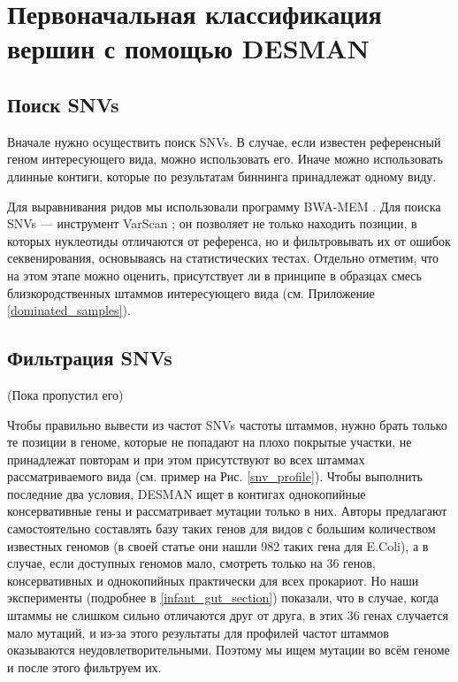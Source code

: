 \documentclass{spbau-diploma}
\begin{document}
\section{Первоначальная классификация вершин с помощью DESMAN}

\subsection{Поиск SNVs}

Вначале нужно осуществить поиск SNVs. В случае, если известен референсный геном интересующего вида, можно использовать его. Иначе можно использовать длинные контиги, которые по результатам биннинга принадлежат одному виду.

Для выравнивания ридов мы использовали программу BWA-MEM \cite{bwa_mem}. Для поиска SNVs --- инструмент VarScan \cite{VarScan}; он позволяет не только находить позиции, в которых нуклеотиды отличаются от референса, но и фильтровывать их от ошибок секвенирования, основываясь на статистических тестах.
Отдельно отметим, что на этом этапе можно оценить, присутствует ли в принципе в образцах смесь близкородственных штаммов интересующего вида (см. Приложение  \ref{dominated_samples}).

\subsection{Фильтрация SNVs} (Пока пропустил его)

Чтобы правильно вывести из частот SNVs частоты штаммов, нужно брать только те позиции в геноме, которые не попадают на плохо покрытые участки, не принадлежат повторам и при этом присутствуют во всех штаммах рассматриваемого вида (см. пример на Рис. \ref{snv_profile}). Чтобы выполнить последние два условия, DESMAN ищет в контигах однокопийные консервативные гены и рассматривает мутации только в них. Авторы предлагают самостоятельно составлять базу таких генов для видов с большим количеством известных геномов (в своей статье они нашли 982 таких гена для E.Coli), а в случае, если доступных геномов мало, смотреть только на 36 генов, консервативных и однокопийных практически для всех прокариот. Но наши эксперименты (подробнее в \ref{infant_gut_section}) показали, что в случае, когда штаммы не слишком сильно отличаются друг от друга, в этих 36 генах случается мало мутаций, и из-за этого результаты для профилей частот штаммов оказываются неудовлетворительными. Поэтому мы ищем мутации во всём геноме и после этого фильтруем их.
\end{document}
